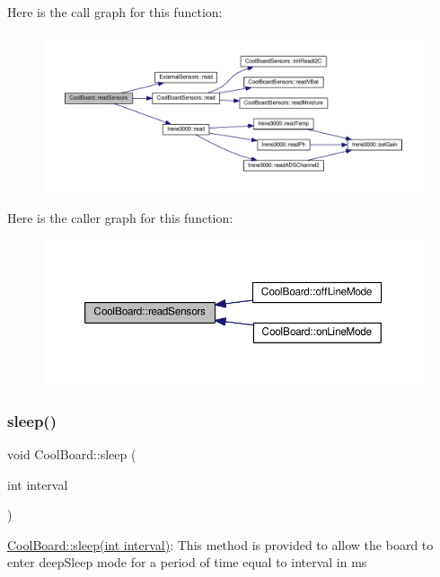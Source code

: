 Here is the call graph for this function\+:
\nopagebreak
\begin{figure}[H]
\begin{center}
\leavevmode
\includegraphics[width=350pt]{classCoolBoard_ad03abdce2e65f520bbf2cff0f2d083cf_cgraph}
\end{center}
\end{figure}
Here is the caller graph for this function\+:
\nopagebreak
\begin{figure}[H]
\begin{center}
\leavevmode
\includegraphics[width=350pt]{classCoolBoard_ad03abdce2e65f520bbf2cff0f2d083cf_icgraph}
\end{center}
\end{figure}
\mbox{\label{classCoolBoard_a5d0c8ff93b615efd676be432de9f164a}} 
\subsubsection{\texorpdfstring{sleep()}{sleep()}}
{\footnotesize\ttfamily void Cool\+Board\+::sleep (\begin{DoxyParamCaption}\item[{int}]{interval }\end{DoxyParamCaption})}

\hyperlink{classCoolBoard_a5d0c8ff93b615efd676be432de9f164a}{Cool\+Board\+::sleep(int interval)}\+: This method is provided to allow the board to enter deep\+Sleep mode for a period of time equal to interval in ms 

